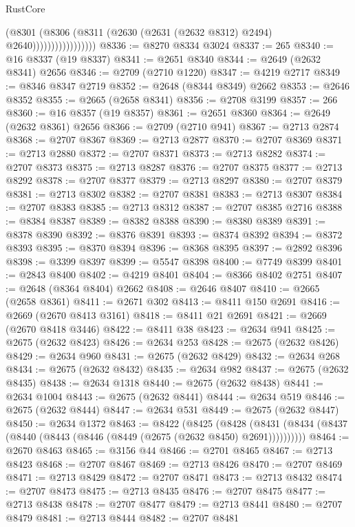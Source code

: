 \begin{lexlean}{RustCore}
\begin{coremodule}
                              (@8301
                                (@8306
                                  (@8311 (@2630 (@2631 (@2632 @8312) @2494) @2640)))))))))))))))))
@8336 := @8270 @8334 @3024
@8337 := 265
@8340 := @16 @8337 (@19 @8337)
@8341 := @2651 @8340
@8344 := @2649 (@2632 @8341) @2656
@8346 := @2709 (@2710 @1220)
@8347 := @4219 @2717
@8349 := @8346 @8347 @2719
@8352 := @2648 (@8344 @8349) @2662
@8353 := @2646 @8352
@8355 := @2665 (@2658 @8341)
@8356 := @2708 @3199
@8357 := 266
@8360 := @16 @8357 (@19 @8357)
@8361 := @2651 @8360
@8364 := @2649 (@2632 @8361) @2656
@8366 := @2709 (@2710 @941)
@8367 := @2713 @2874
@8368 := @2707 @8367
@8369 := @2713 @2877
@8370 := @2707 @8369
@8371 := @2713 @2880
@8372 := @2707 @8371
@8373 := @2713 @8282
@8374 := @2707 @8373
@8375 := @2713 @8287
@8376 := @2707 @8375
@8377 := @2713 @8292
@8378 := @2707 @8377
@8379 := @2713 @8297
@8380 := @2707 @8379
@8381 := @2713 @8302
@8382 := @2707 @8381
@8383 := @2713 @8307
@8384 := @2707 @8383
@8385 := @2713 @8312
@8387 := @2707 @8385 @2716
@8388 := @8384 @8387
@8389 := @8382 @8388
@8390 := @8380 @8389
@8391 := @8378 @8390
@8392 := @8376 @8391
@8393 := @8374 @8392
@8394 := @8372 @8393
@8395 := @8370 @8394
@8396 := @8368 @8395
@8397 := @2892 @8396
@8398 := @3399 @8397
@8399 := @5547 @8398
@8400 := @7749 @8399
@8401 := @2843 @8400
@8402 := @4219 @8401
@8404 := @8366 @8402 @2751
@8407 := @2648 (@8364 @8404) @2662
@8408 := @2646 @8407
@8410 := @2665 (@2658 @8361)
@8411 := @2671 @302
@8413 := @8411 @150 @2691
@8416 := @2669 (@2670 @8413 @3161)
@8418 := @8411 @21 @2691
@8421 := @2669 (@2670 @8418 @3446)
@8422 := @8411 @38
@8423 := @2634 @941
@8425 := @2675 (@2632 @8423)
@8426 := @2634 @253
@8428 := @2675 (@2632 @8426)
@8429 := @2634 @960
@8431 := @2675 (@2632 @8429)
@8432 := @2634 @268
@8434 := @2675 (@2632 @8432)
@8435 := @2634 @982
@8437 := @2675 (@2632 @8435)
@8438 := @2634 @1318
@8440 := @2675 (@2632 @8438)
@8441 := @2634 @1004
@8443 := @2675 (@2632 @8441)
@8444 := @2634 @519
@8446 := @2675 (@2632 @8444)
@8447 := @2634 @531
@8449 := @2675 (@2632 @8447)
@8450 := @2634 @1372
@8463 := @8422
    (@8425
      (@8428 (@8431 (@8434 (@8437 (@8440 (@8443 (@8446 (@8449 (@2675 (@2632 @8450) @2691))))))))))
@8464 := @2670 @8463
@8465 := @3156 @44
@8466 := @2701 @8465
@8467 := @2713 @8423
@8468 := @2707 @8467
@8469 := @2713 @8426
@8470 := @2707 @8469
@8471 := @2713 @8429
@8472 := @2707 @8471
@8473 := @2713 @8432
@8474 := @2707 @8473
@8475 := @2713 @8435
@8476 := @2707 @8475
@8477 := @2713 @8438
@8478 := @2707 @8477
@8479 := @2713 @8441
@8480 := @2707 @8479
@8481 := @2713 @8444
@8482 := @2707 @8481

\end{coremodule}
\end{lexlean}
